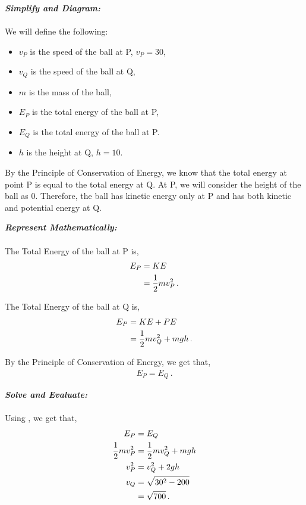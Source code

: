 \begin{subquestions}
\textbf{\textit{Simplify and Diagram:}} \\ \\
We will define the following:
\begin{itemize}
	\item $v_P$ is the speed of the ball at P, $v_P=30$,
	\item $v_Q$ is the speed of the ball at Q,
	\item $m$ is the mass of the ball,
	\item $E_P$ is the total energy of the ball at P,
	\item $E_Q$ is the total energy of the ball at P.
	\item $h$ is the height at Q, $h=10$.
\end{itemize}
By the Principle of Conservation of Energy, we know that the total energy at point P is equal to the total energy at Q. At P, we will consider the height of the ball as 0. Therefore, the ball has kinetic energy only at P and has both kinetic and potential energy at Q.





\textbf{\textit{Represent Mathematically:}} \\ \\
The Total Energy of the ball at P is,
\begin{align}
	E_P & = KE \nonumber \\
	    & = \frac{1}{2}mv_P^2 \,.
\end{align}

The Total Energy of the ball at Q is,
\begin{align}
	E_P & = KE + PE \nonumber \\
        & = \frac{1}{2}mv_Q^2 + mgh \,.
\end{align}

By the Principle of Conservation of Energy, we get that,
\begin{align}
	E_P = E_Q \label{2005:q6:EEqn1} \,.
\end{align}




\textbf{\textit{Solve and Evaluate:}} \\ \\
Using , we get that,
\begin{align}
	E_P & = E_Q \nonumber \\
	\frac{1}{2}mv_P^2 & = \frac{1}{2}mv_Q^2 + mgh \nonumber \\
	v_P^2 & = v_Q^2 +2gh \nonumber \\
	v_Q & = \sqrt{30^2 - 200} \nonumber \\
	    & = \sqrt{700} \,.
\end{align}
	
\end{subquestions}